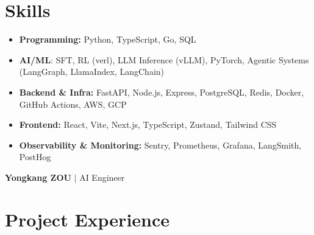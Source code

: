 \documentclass[a4paper,10pt]{article}
\begin{document}

\section{Skills}

\begin{itemize}[
  leftmargin=0pt,
  label={},
  itemsep=4pt,
  parsep=0pt,
  topsep=0pt,
  partopsep=0pt
]
  \item \textbf{Programming:} Python, TypeScript, Go, SQL

  \item \textbf{AI/ML}: SFT, RL (verl), LLM Inference (vLLM), PyTorch, Agentic Systems (LangGraph, LlamaIndex, LangChain)

  \item \textbf{Backend \& Infra:} FastAPI, Node.js, Express, PostgreSQL, Redis, Docker, GitHub Actions, AWS, GCP

  \item \textbf{Frontend:} React, Vite, Next.js, TypeScript, Zustand, Tailwind CSS

  \item \textbf{Observability \& Monitoring:} Sentry, Prometheus, Grafana, LangSmith, PostHog

\end{itemize}


\newpage

{\fontsize{11}{13}\selectfont
  \textbf{Yongkang ZOU} $|$ AI Engineer\par}

\vspace{1pt}


\section{Project Experience}
\end{document}

